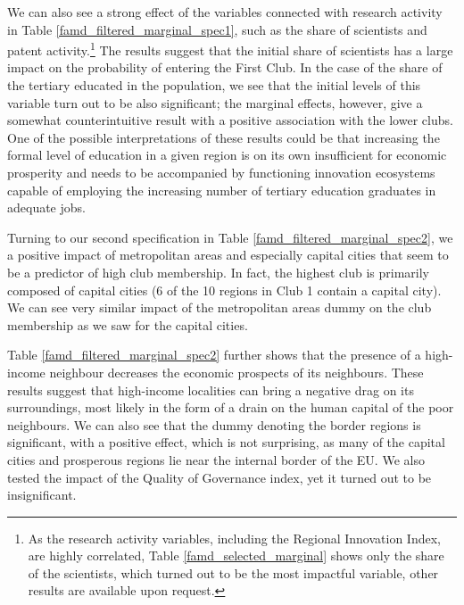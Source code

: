 \documentclass[11pt]{article}
\begin{document}
We can also see a strong effect of the variables connected with research activity in Table \ref{famd_filtered_marginal_spec1}, such as the share of scientists and patent activity.\footnote{As the research activity variables, including the Regional Innovation Index, are highly correlated, Table \ref{famd_selected_marginal} shows only the share of the scientists, which turned out to be the most impactful variable, other results are available upon request.} The results suggest that the initial share of scientists has a large impact on the probability of entering the First Club. In the case of the share of the tertiary educated in the population, we see that the initial levels of this variable turn out to be also significant; the marginal effects, however, give a somewhat counterintuitive result with a positive association with the lower clubs. One of the possible interpretations of these results could be that increasing the formal level of education in a given region is on its own insufficient for economic prosperity and needs to be accompanied by functioning innovation ecosystems capable of employing the increasing number of tertiary education graduates in adequate jobs.

Turning to our second specification in Table \ref{famd_filtered_marginal_spec2}, we a positive impact of metropolitan areas and especially capital cities that seem to be a predictor of high club membership. In fact, the highest club is primarily composed of capital cities (6 of the 10 regions in Club 1 contain a capital city).  We can see very similar impact of the metropolitan areas dummy on the club membership as we saw for the capital cities.

Table \ref{famd_filtered_marginal_spec2} further shows that the presence of a high-income neighbour decreases the economic prospects of its neighbours. These results suggest that high-income localities can bring a negative drag on its surroundings, most likely in the form of a drain on the human capital of the poor neighbours. We can also see that the dummy denoting the border regions is significant, with a positive effect, which is not surprising, as many of the capital cities and prosperous regions lie near the internal border of the EU. We also tested the impact of the Quality of Governance index, yet it turned out to be insignificant.
\end{document}
